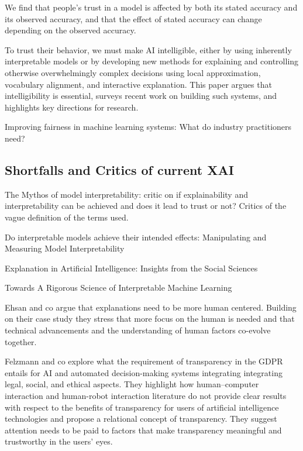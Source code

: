 \documentclass[manuscript,screen,review]{acmart}
\begin{document}
We find that people's trust in a model is affected by both its stated accuracy and its observed accuracy, and that the effect of stated accuracy can change depending on the observed accuracy\cite{Yin2019}.

To trust their behavior, we must make AI intelligible, either by using inherently interpretable models or by developing new methods for explaining and controlling otherwise overwhelmingly complex decisions using local approximation, vocabulary alignment, and interactive explanation.
This paper argues that intelligibility is essential, surveys recent work on building such systems, and highlights key directions for research\cite{Weld2019}.

Improving fairness in machine learning systems: What do industry practitioners need?\cite{Holstein2019}

\subsection{Shortfalls and Critics of current XAI}\label{subsec:shortfalls-and-critics-of-current-xai}
The Mythos of model interpretability\cite{Lipton2018}: critic on if explainability and interpretability can be achieved and does it lead to trust or not? Critics of the vague definition of the terms used.

Do interpretable models achieve their intended effects: Manipulating and Measuring Model Interpretability\cite{Goldstein2021}

Explanation in Artificial Intelligence: Insights from the Social Sciences\cite{Miller2019}

Towards A Rigorous Science of Interpretable Machine Learning\cite{Doshi-Velez2017}

Ehsan and co argue that explanations need to be more human centered.
Building on their case study they stress that more focus on the human is needed and that technical advancements and the understanding of human factors co-evolve together.\cite{Ehsan2020}

Felzmann and co explore what the requirement of transparency in the GDPR entails for AI and automated decision-making systems integrating integrating legal, social, and ethical aspects.
They highlight how human–computer interaction and human-robot interaction literature do not provide clear results with respect to the benefits of transparency for users of artificial intelligence technologies
and propose a relational concept of transparency. They suggest attention needs to be paid to factors that make transparency meaningful and trustworthy in the users’ eyes.\cite{Felzmann2019}
\end{document}
